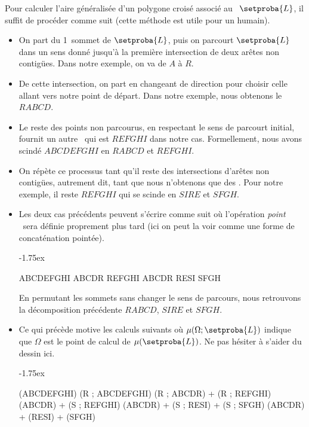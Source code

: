 Pour calculer l'aire généralisée d'un polygone croisé associé au \ncycle\ $\setproba{L}$, il suffit de procéder comme suit (cette méthode est utile pour un humain).
%
\begin{itemize}
    \item On part du 1\iere\ sommet de $\setproba{L}$, puis on parcourt $\setproba{L}$ dans un sens donné jusqu'à la première intersection de deux arêtes non contigües. Dans notre exemple, on va de $A$ à $R$.


    \item De cette intersection, on part en changeant de direction pour choisir celle allant vers notre point de départ. Dans notre exemple, nous obtenons le  $RABCD$.


    \item Le reste des points non parcourus, en respectant le sens de parcourt initial, fournit un autre \kcycle\ qui est $REFGHI$ dans notre cas. Formellement, nous avons scindé $ABCDEFGHI$ en $RABCD$ et $REFGHI$.


    \item On répète ce processus tant qu'il reste des intersections d'arêtes non contigües, autrement dit, tant que nous n'obtenons que des \kgones.
    Pour notre exemple, il reste $REFGHI$ qui se scinde en $SIRE$ et $SFGH$.


    \item Les deux cas précédents peuvent s'écrire comme suit où l'opération \og \emph{point} \fg\ sera définie proprement plus tard (ici on peut la voir comme une forme de concaténation pointée).

    \smallskip
    \noindent\kern-1.75ex
    \begin{stepcalc}[style=ar*]
    	ABCDEFGHI
		ABCDR \cdot REFGHI
		ABCDR \cdot RESI \cdot SFGH
    \end{stepcalc}

    \smallskip
    \noindent
    En permutant les sommets sans changer le sens de parcours, nous retrouvons la décomposition précédente $RABCD$, $SIRE$ et $SFGH$.


    \item Ce qui précède motive les calculs suivants où $\mu(\Omega ; \setproba{L})$ indique que $\Omega$ est le point de calcul de $\mu(\setproba{L})$. Ne pas hésiter à s'aider du dessin ici.

    \smallskip
    
    \noindent\kern-1.75ex
    \begin{stepcalc}[style=ar*]
    	\mu(ABCDEFGHI)
    	\mu(R ; ABCDEFGHI)
    	\mu(R ; ABCDR) + \mu(R ; REFGHI)
    	\mu(ABCDR) + \mu(S ; REFGHI)
    	\mu(ABCDR) + \mu(S ; RESI) + \mu(S ; SFGH)
	\explnext{}
    	\mu(ABCDR) + \mu(RESI) + \mu(SFGH)
    \end{stepcalc}
    

\end{itemize}
